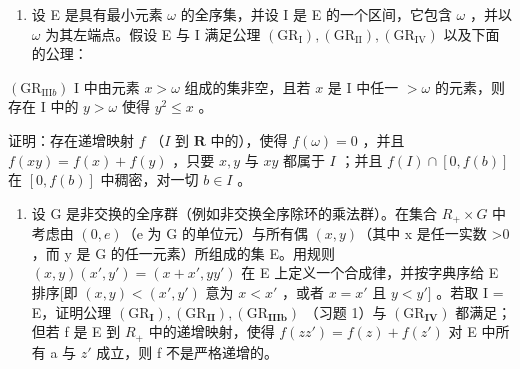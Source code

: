 \ExerciseSection

\begin{enumerate}
\def\labelenumi{\arabic{enumi})}
\tightlist
\item
  设 E 是具有最小元素 \(\omega\) 的全序集，并设 I 是 E 的一个区间，它包含 \(\omega\) ，并以 \(\omega\) 为其左端点。假设 E 与 I 满足公理 \((\mathrm{GR}_{\mathrm{I}}), (\mathrm{GR}_{\mathrm{II}}), (\mathrm{GR}_{\mathrm{IV}})\) 以及下面的公理：
\end{enumerate}

\((\mathrm{GR}_{\mathrm{III}b})\) I 中由元素 \(x > \omega\) 组成的集非空，且若 \(x\) 是 I 中任一 \(> \omega\) 的元素，则存在 I 中的 \(y > \omega\) 使得 \(y^2 \leqslant x\) 。

证明：存在递增映射 \(f\) （\(I\) 到 \(\mathbf{R}\) 中的），使得 \(f(\omega) = 0\) ，并且 \(f(xy) = f(x) + f(y)\) ，只要 \(x, y\) 与 \(xy\) 都属于 \(I\) ；并且 \(f(I) \cap [0, f(b)]\) 在 \([0, f(b)]\) 中稠密，对一切 \(b \in I\) 。

\begin{enumerate}
\def\labelenumi{\arabic{enumi})}
\setcounter{enumi}{1}
\tightlist
\item
  设 G 是非交换的全序群（例如非交换全序除环的乘法群）。在集合 \(R_{+} \times G\) 中考虑由 \((0, e)\)（e 为 G 的单位元）与所有偶 \((x, y)\)（其中 x 是任一实数 \textgreater0 ，而 y 是 G 的任一元素）所组成的集 E。用规则 \((x, y)(x', y') = (x + x', yy')\) 在 E 上定义一个合成律，并按字典序给 E 排序{[}即 \((x, y) < (x', y')\) 意为 \(x < x'\) ，或者 \(x = x'\) 且 \(y < y']\) 。若取 I = E，证明公理 \((\mathrm{GR}_{\mathbf{I}}), (\mathrm{GR}_{\mathbf{II}}), (\mathrm{GR}_{\mathbf{IIIb}})\) （习题 1）与 \((\mathrm{GR}_{\mathbf{IV}})\) 都满足；但若 f 是 E 到 \(R_{+}\) 中的递增映射，使得 \(f(zz') = f(z) + f(z')\) 对 E 中所有 a 与 \(z'\) 成立，则 f 不是严格递增的。
\end{enumerate}

